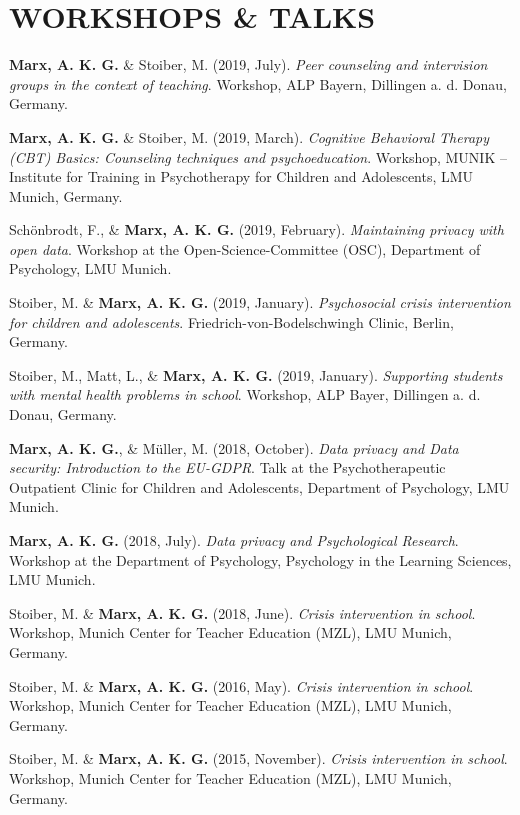 \documentclass[letterpaper]{article}
\renewenvironment{itemize}{ %
  \begin{list}{}{ %
    \setlength{\leftmargin}{2.5em} %
  }
}{
  \end{list}
}
\begin{document}
\section*{WORKSHOPS \& TALKS}
\begin{itemize}
\item {\bf Marx, A. K. G.} \& Stoiber, M. (2019, July). {\it Peer counseling and intervision groups in the context of teaching}. Workshop, ALP Bayern, Dillingen a. d. Donau, Germany.
\item {\bf Marx, A. K. G.} \& Stoiber, M. (2019, March). {\it Cognitive Behavioral Therapy (CBT) Basics: Counseling techniques and psychoeducation}. Workshop, MUNIK – Institute for Training in Psychotherapy for Children and Adolescents, LMU Munich, Germany.
\item Schönbrodt, F., \& {\bf Marx, A. K. G.} (2019, February). {\it Maintaining privacy with open data}. Workshop at the Open-Science-Committee (OSC), Department of Psychology, LMU Munich.
\item Stoiber, M. \& {\bf Marx, A. K. G.} (2019, January). {\it Psychosocial crisis intervention for children and adolescents}. Friedrich-von-Bodelschwingh Clinic, Berlin, Germany.
\item Stoiber, M., Matt, L., \& {\bf Marx, A. K. G.} (2019, January). {\it Supporting students with mental health problems in school}. Workshop, ALP Bayer, Dillingen a. d. Donau, Germany.
\item {\bf Marx, A. K. G.}, \& Müller, M. (2018, October). {\it Data privacy and Data security: Introduction to the EU-GDPR}. Talk at the Psychotherapeutic Outpatient Clinic for Children and Adolescents, Department of Psychology, LMU Munich.
\item {\bf Marx, A. K. G.} (2018, July). {\it Data privacy and Psychological Research}. Workshop at the Department of Psychology, Psychology in the Learning Sciences, LMU Munich.
\item Stoiber, M. \& {\bf Marx, A. K. G.} (2018, June). {\it Crisis intervention in school}. Workshop, Munich Center for Teacher Education (MZL), LMU Munich, Germany.
\item Stoiber, M. \& {\bf Marx, A. K. G.} (2016, May). {\it Crisis intervention in school}. Workshop, Munich Center for Teacher Education (MZL), LMU Munich, Germany.
\item Stoiber, M. \& {\bf Marx, A. K. G.} (2015, November). {\it Crisis intervention in school}. Workshop, Munich Center for Teacher Education (MZL), LMU Munich, Germany.
\end{itemize}
\end{document}
